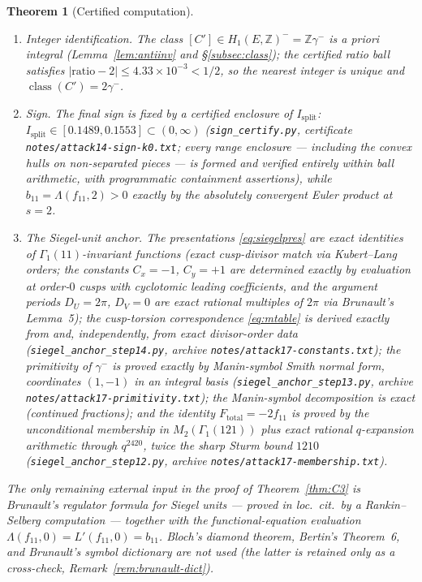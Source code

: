 \documentclass[preprint,12pt]{elsarticle}
\newtheorem{theorem}{Theorem}[section]
\theoremstyle{definition}
\theoremstyle{remark}
\newcommand{\Z}{\mathbb{Z}}
\DeclareMathOperator{\class}{class}
\begin{document}
\begin{theorem}[Certified computation]
\begin{enumerate}
  period \textup{(}\texttt{n1\_interval.py}, certificate
  \texttt{notes/attack10-interval.txt}\textup{)}.
  \item \emph{Integer identification.} The class $[C']\in H_1(E,\Z)^-=\Z\gamma^-$
  is a priori integral \textup{(}Lemma~\ref{lem:antiinv} and
  \S\ref{subsec:class}\textup{)}; the certified ratio ball satisfies
  $|\mathrm{ratio}-2|\le4.33\times10^{-3}<1/2$, so the nearest integer is
  unique and $\class(C')=2\gamma^-$.
  \item \emph{Sign.} The final sign is fixed by a certified enclosure of
  $I_{\mathrm{split}}$: $I_{\mathrm{split}}\in[0.1489,0.1553]\subset(0,\infty)$
  \textup{(}\texttt{sign\_certify.py}, certificate
  \texttt{notes/attack14-sign-k0.txt}; every range enclosure --- including
  the convex hulls on non-separated pieces --- is formed and verified
  entirely within ball arithmetic, with programmatic containment
  assertions\textup{)}, while
  $b_{11}=\Lambda(f_{11},2)>0$ exactly by the absolutely convergent Euler
  product at $s=2$.
  \item \emph{The Siegel-unit anchor.} The presentations
  \eqref{eq:siegelpres} are exact identities of $\Gamma_1(11)$-invariant
  functions \textup{(}exact cusp-divisor match via Kubert--Lang orders;
  the constants $C_x=-1$, $C_y=+1$ are determined exactly by evaluation
  at order-$0$ cusps with cyclotomic leading coefficients, and the
  argument periods $D_U=2\pi$, $D_V=0$ are exact rational multiples of
  $2\pi$ via Brunault's Lemma~5\textup{)}; the cusp-torsion
  correspondence \eqref{eq:mtable} is derived exactly from
  \cite[(3.152)--(3.153)]{Brunault} and, independently, from exact
  divisor-order data \textup{(}\texttt{siegel\_anchor\_step14.py},
  archive \texttt{notes/attack17-constants.txt}\textup{)}; the
  primitivity of $\gamma^-$ is proved exactly by Manin-symbol Smith
  normal form, coordinates $(1,-1)$ in an integral basis
  \textup{(}\texttt{siegel\_anchor\_step13.py}, archive
  \texttt{notes/attack17-primitivity.txt}\textup{)}; the Manin-symbol
  decomposition is exact \textup{(}continued fractions\textup{)}; and
  the identity $F_{\mathrm{total}}=-2f_{11}$ is proved by the
  unconditional membership in $M_2(\Gamma_1(121))$ plus exact rational
  $q$-expansion arithmetic through $q^{2420}$, twice the sharp Sturm
  bound $1210$ \textup{(}\texttt{siegel\_anchor\_step12.py}, archive
  \texttt{notes/attack17-membership.txt}\textup{)}.
\end{enumerate}
The only remaining external input in the proof of
Theorem~\ref{thm:C3} is Brunault's regulator formula for Siegel units
\cite[Thm.~1]{BrunaultSiegel} --- proved in loc.\ cit.\ by a Rankin--Selberg
computation --- together with the functional-equation evaluation
$\Lambda(f_{11},0)=L'(f_{11},0)=b_{11}$.  Bloch's diamond theorem,
Bertin's Theorem~6, and Brunault's symbol dictionary are \emph{not} used
\textup{(}the latter is retained only as a cross-check,
Remark~\ref{rem:brunault-dict}\textup{)}.
\end{theorem}
\end{document}
